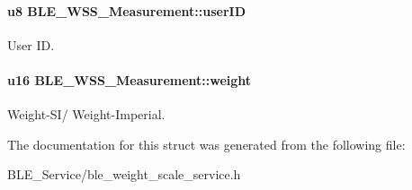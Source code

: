 \paragraph[{\texorpdfstring{user\+ID}{userID}}]{\setlength{\rightskip}{0pt plus 5cm}u8 B\+L\+E\+\_\+\+W\+S\+S\+\_\+\+Measurement\+::user\+ID}\hypertarget{struct_b_l_e___w_s_s___measurement_a468883c1999326218ce09f9538049276}{}\label{struct_b_l_e___w_s_s___measurement_a468883c1999326218ce09f9538049276}
User ID. 
\paragraph[{\texorpdfstring{weight}{weight}}]{\setlength{\rightskip}{0pt plus 5cm}u16 B\+L\+E\+\_\+\+W\+S\+S\+\_\+\+Measurement\+::weight}\hypertarget{struct_b_l_e___w_s_s___measurement_ab804dc1b47b508623f56656793e24780}{}\label{struct_b_l_e___w_s_s___measurement_ab804dc1b47b508623f56656793e24780}
Weight-\/\+S\+I/ Weight-\/\+Imperial. 

The documentation for this struct was generated from the following file\+:\begin{DoxyCompactItemize}
\item 
B\+L\+E\+\_\+\+Service/ble\+\_\+weight\+\_\+scale\+\_\+service.\+h\end{DoxyCompactItemize}
